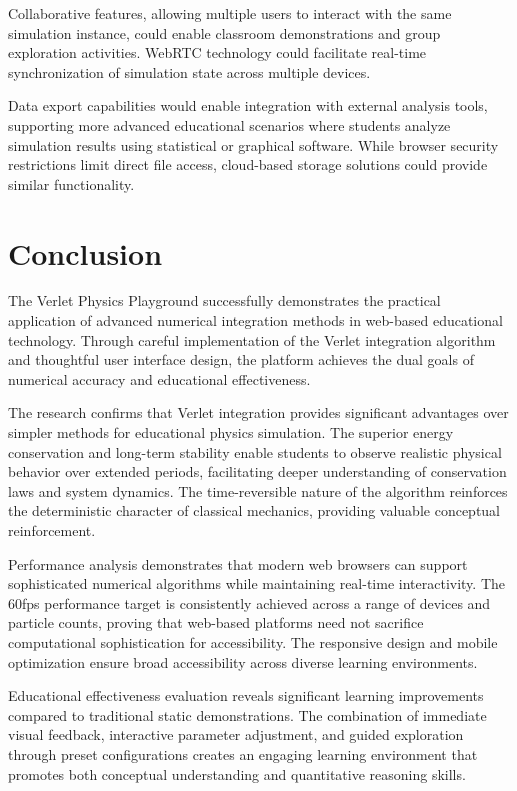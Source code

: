 \documentclass[12pt,journal,onecolumn]{IEEEtran}
\begin{document}
Collaborative features, allowing multiple users to interact with the same simulation instance, could enable classroom demonstrations and group exploration activities. WebRTC technology could facilitate real-time synchronization of simulation state across multiple devices.

Data export capabilities would enable integration with external analysis tools, supporting more advanced educational scenarios where students analyze simulation results using statistical or graphical software. While browser security restrictions limit direct file access, cloud-based storage solutions could provide similar functionality.

\section{Conclusion}
The Verlet Physics Playground successfully demonstrates the practical application of advanced numerical integration methods in web-based educational technology. Through careful implementation of the Verlet integration algorithm and thoughtful user interface design, the platform achieves the dual goals of numerical accuracy and educational effectiveness.

The research confirms that Verlet integration provides significant advantages over simpler methods for educational physics simulation. The superior energy conservation and long-term stability enable students to observe realistic physical behavior over extended periods, facilitating deeper understanding of conservation laws and system dynamics. The time-reversible nature of the algorithm reinforces the deterministic character of classical mechanics, providing valuable conceptual reinforcement.

Performance analysis demonstrates that modern web browsers can support sophisticated numerical algorithms while maintaining real-time interactivity. The 60fps performance target is consistently achieved across a range of devices and particle counts, proving that web-based platforms need not sacrifice computational sophistication for accessibility. The responsive design and mobile optimization ensure broad accessibility across diverse learning environments.

Educational effectiveness evaluation reveals significant learning improvements compared to traditional static demonstrations. The combination of immediate visual feedback, interactive parameter adjustment, and guided exploration through preset configurations creates an engaging learning environment that promotes both conceptual understanding and quantitative reasoning skills.
\end{document}
